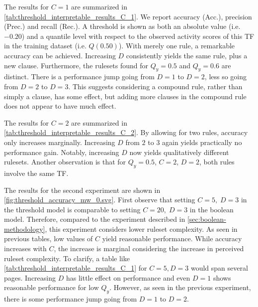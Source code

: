 The results for $C=1$ are summarized in \autoref{tab:threshold_interpretable_results_C_1}.
We report accuracy (Acc.), precision (Prec.) and recall (Rec.).
A threshold is shown as both an absolute value (i.e. $-0.20$) and a quantile level
with respect to the observed activity scores of this TF in the training dataset (i.e. $Q(0.50)$).
With merely one rule, a remarkable accuracy can be achieved.
Increasing $D$ consistently yields the same rule, plus a new clause.
Furthermore, the rulesets found for $Q_y=0.5$ and $Q_y=0.6$ are distinct.
There is a performance jump going from $D=1$ to $D=2$, less so going from $D=2$ to $D=3$.
This suggests considering a compound rule, rather than simply a clause, has some effect, but
adding more clauses in the compound rule does not appear to have much effect.

The results for $C=2$ are summarized in \autoref{tab:threshold_interpretable_results_C_2}.
By allowing for two rules, accuracy only increases marginally.
Increasing $D$ from $2$ to $3$ again yields practically no performance gain.
Notably, increasing $D$ now yields qualitatively different rulesets.
Another observation is that for $Q_y=0.5$, $C=2$, $D=2$, both rules involve the same TF\@.

\begin{table}[h]
    \centering
    \caption{Results for the full Broad dataset for $C=1$ and small rules ($D=1,2,3$).}
    \label{tab:threshold_interpretable_results_C_1}
\end{table}

\begin{table}[h]
    \caption{Results for the full Broad dataset for $C=2$ and small rules ($D=1,2,3$).}
    \label{tab:threshold_interpretable_results_C_2}
\end{table}

The results for the second experiment are shown in \autoref{fig:threshold_accuracy_mw_0.svg}.
First observe that setting $C=5, \; D=3$ in the threshold model
is comparable to setting $C=20, \; D=3$ in the boolean model.
Therefore, compared to the experiment described in \autoref{sec:boolean-methodology},
this experiment considers lower ruleset complexity.
As seen in previous tables, low values of $C$ yield reasonable performance.
While accuracy increases with $C$, the increase is marginal considering the increase in perceived ruleset complexity.
To clarify, a table like \autoref{tab:threshold_interpretable_results_C_1} for $C=5, D=3$ would span several pages.
Increasing $D$ has little effect on performance and even $D=1$ shows reasonable performance for low $Q_y$.
However, as seen in the previous experiment, there is some performance jump going from $D=1$ to $D=2$.

